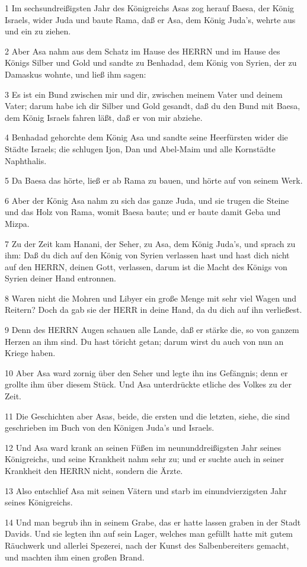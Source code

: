\par 1 Im sechsundreißigsten Jahr des Königreichs Asas zog herauf Baesa, der König Israels, wider Juda und baute Rama, daß er Asa, dem König Juda's, wehrte aus und ein zu ziehen.
\par 2 Aber Asa nahm aus dem Schatz im Hause des HERRN und im Hause des Königs Silber und Gold und sandte zu Benhadad, dem König von Syrien, der zu Damaskus wohnte, und ließ ihm sagen:
\par 3 Es ist ein Bund zwischen mir und dir, zwischen meinem Vater und deinem Vater; darum habe ich dir Silber und Gold gesandt, daß du den Bund mit Baesa, dem König Israels fahren läßt, daß er von mir abziehe.
\par 4 Benhadad gehorchte dem König Asa und sandte seine Heerfürsten wider die Städte Israels; die schlugen Ijon, Dan und Abel-Maim und alle Kornstädte Naphthalis.
\par 5 Da Baesa das hörte, ließ er ab Rama zu bauen, und hörte auf von seinem Werk.
\par 6 Aber der König Asa nahm zu sich das ganze Juda, und sie trugen die Steine und das Holz von Rama, womit Baesa baute; und er baute damit Geba und Mizpa.
\par 7 Zu der Zeit kam Hanani, der Seher, zu Asa, dem König Juda's, und sprach zu ihm: Daß du dich auf den König von Syrien verlassen hast und hast dich nicht auf den HERRN, deinen Gott, verlassen, darum ist die Macht des Königs von Syrien deiner Hand entronnen.
\par 8 Waren nicht die Mohren und Libyer ein große Menge mit sehr viel Wagen und Reitern? Doch da gab sie der HERR in deine Hand, da du dich auf ihn verließest.
\par 9 Denn des HERRN Augen schauen alle Lande, daß er stärke die, so von ganzem Herzen an ihm sind. Du hast töricht getan; darum wirst du auch von nun an Kriege haben.
\par 10 Aber Asa ward zornig über den Seher und legte ihn ins Gefängnis; denn er grollte ihm über diesem Stück. Und Asa unterdrückte etliche des Volkes zu der Zeit.
\par 11 Die Geschichten aber Asas, beide, die ersten und die letzten, siehe, die sind geschrieben im Buch von den Königen Juda's und Israels.
\par 12 Und Asa ward krank an seinen Füßen im neununddreißigsten Jahr seines Königreichs, und seine Krankheit nahm sehr zu; und er suchte auch in seiner Krankheit den HERRN nicht, sondern die Ärzte.
\par 13 Also entschlief Asa mit seinen Vätern und starb im einundvierzigsten Jahr seines Königreichs.
\par 14 Und man begrub ihn in seinem Grabe, das er hatte lassen graben in der Stadt Davids. Und sie legten ihn auf sein Lager, welches man gefüllt hatte mit gutem Räuchwerk und allerlei Spezerei, nach der Kunst des Salbenbereiters gemacht, und machten ihm einen großen Brand.

